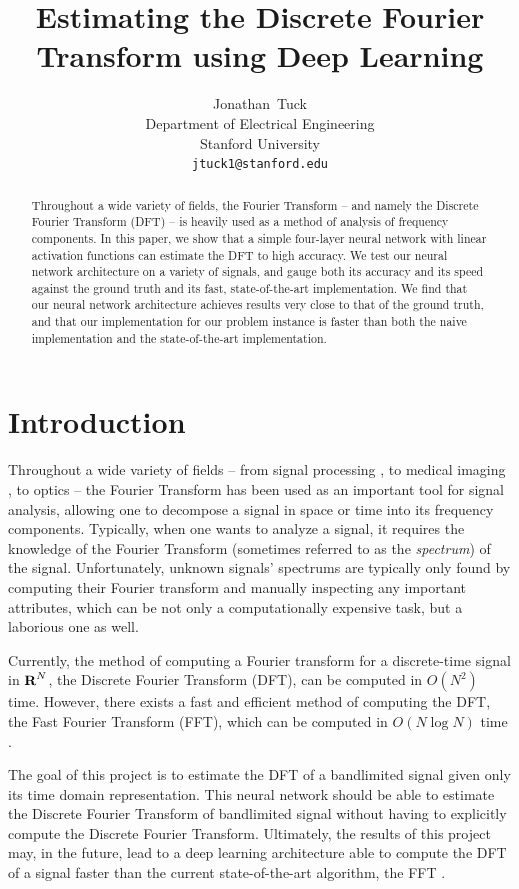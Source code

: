 \documentclass[12pt]{article}
\title{
Estimating the Discrete Fourier Transform using Deep Learning
}
\author{
  Jonathan~Tuck\\
  Department of Electrical Engineering\\
  Stanford University\\
  \texttt{jtuck1@stanford.edu} \\
}
\begin{document}
\maketitle

\begin{abstract}
Throughout a wide variety of fields, the Fourier Transform -- and namely the Discrete Fourier Transform (DFT) -- 
is heavily used as a method of analysis of frequency components. In this paper, we show that a simple four-layer 
neural network with linear activation functions can estimate the DFT to high accuracy. We test our neural network 
architecture on a variety of signals, and gauge both its accuracy and its speed against the ground truth and its 
fast, state-of-the-art implementation. We find that our neural network architecture achieves results very close 
to that of the ground truth, and that our implementation for our problem instance is faster than both the naive 
implementation and the state-of-the-art implementation.
\end{abstract}

\section{Introduction}
Throughout a wide variety of fields -- from signal processing \cite{OS:99}, to medical imaging \cite{S:00}, 
to optics \cite{G:96} -- the Fourier Transform has been used as an important tool for signal analysis, allowing 
one to decompose a signal in space or time into its frequency components. Typically, when one wants to analyze a 
signal, it requires the knowledge of the Fourier Transform (sometimes referred to as the \emph{spectrum}) of the 
signal. Unfortunately, unknown signals' spectrums are typically only found by computing their Fourier transform 
and manually inspecting any important attributes, which can be not only a computationally expensive task, but a 
laborious one as well. 

Currently, the method of computing a Fourier transform for a discrete-time signal in ${\mbox{\bf R}}^N$, the Discrete 
Fourier Transform (DFT), can be computed in $O(N^2)$ time. However, there exists a fast and efficient 
method of computing the DFT, the Fast Fourier Transform (FFT), which can be computed 
in $O(N \log N)$ time \cite{B:78,O:17}.

The goal of this project is to estimate the DFT of a bandlimited signal given only 
its time domain representation. This neural network should be able to estimate the Discrete Fourier 
Transform of bandlimited signal without having to explicitly compute the Discrete Fourier Transform. 
Ultimately, the results of this project may, in the future, lead to a deep learning architecture able to 
compute the DFT of a signal faster than the current state-of-the-art algorithm, the FFT \cite{CT:65}.
\end{document}
